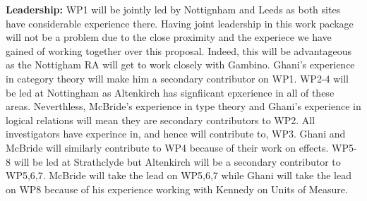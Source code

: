 \documentclass[a4paper,11pt]{article}
\begin{document}
{\bf Leadership:} WP1 will be jointly led by Nottignham and Leeds as
both sites have considerable experience there. Having joint leadership
in this work package will not be a problem due to the close proximity
and the experiece we have gained of working together over this
proposal. Indeed, this will be advantageous as the Nottigham RA will
get to work closely with Gambino. Ghani's experience in category
theory will make him a secondary contributor on WP1. WP2-4 will be led
at Nottingham as Altenkirch has signfiicant epxerience in all of these
areas. Neverthless, McBride's experience in type theory and Ghani's
experience in logical relations will mean they are secondary
contributors to WP2. All investigators have experince in, and hence
will contribute to, WP3. Ghani and McBride will similarly contribute
to WP4 because of their work on effects. WP5-8 will be led at
Strathclyde but Altenkirch will be a secondary contributor to
WP5,6,7. McBride will take the lead on WP5,6,7 while Ghani will take
the lead on WP8 because of his experience working with Kennedy on
Units of Measure.
\end{document}
